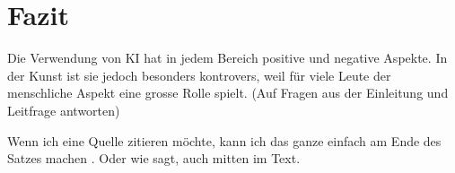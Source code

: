 \documentclass{article}
\begin{document}
\section{Fazit}
    Die Verwendung von KI hat in jedem Bereich positive und negative Aspekte. In der Kunst ist sie jedoch 
    besonders kontrovers, weil für viele Leute der menschliche Aspekt eine grosse Rolle spielt.
    (Auf Fragen aus der Einleitung und Leitfrage antworten)

Wenn ich eine Quelle zitieren möchte, kann ich das ganze einfach am Ende des Satzes machen \citep{example}. Oder wie \citet{example} sagt, auch mitten im Text.

\printbibliography
\end{document}
